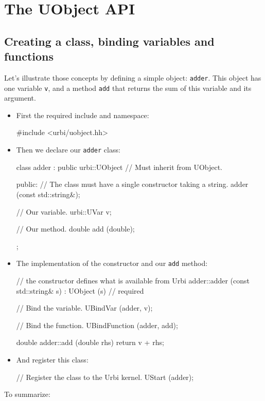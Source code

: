 \chapter{The UObject API}
\label{sec:uob:api}

\section{Creating a class, binding variables and functions}
\label{sec:uob:api:bind}

Let's illustrate those concepts by defining a simple object:
\lstinline{adder}. This object has one variable \lstinline{v}, and a
method \lstinline{add} that returns the sum of this variable and its
argument.

\begin{itemize}
\item First the required include and namespace:

\begin{cxx}
#include <urbi/uobject.hh>
\end{cxx}

\item Then we declare our \lstinline{adder} class:
\begin{cxx}
class adder : public urbi::UObject // Must inherit from UObject.
{
  public:
   // The class must have a single constructor taking a string.
   adder (const std::string&);

   // Our variable.
   urbi::UVar v;

   // Our method.
   double add (double);
};
\end{cxx}
\item The implementation of the constructor and our \lstinline{add}
  method:
\begin{cxx}
// the constructor defines what is available from Urbi
adder::adder (const std::string& s)
  : UObject (s) // required
{
  // Bind the variable.
  UBindVar (adder, v);

  // Bind the function.
  UBindFunction (adder, add);
}

double
adder::add (double rhs)
{
  return v + rhs;
}
\end{cxx}
\item And register this class:
\begin{cxx}
// Register the class to the Urbi kernel.
UStart (adder);
\end{cxx}
\end{itemize}

To summarize:


